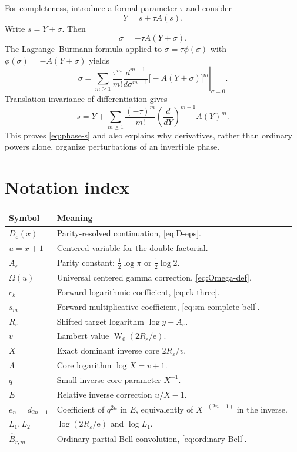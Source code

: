 \documentclass[11pt,a4paper,oneside]{book}
\newcommand{\e}{\mathrm e}
\newcommand{\W}{\operatorname W}
\newcommand{\eps}{\varepsilon}
\begin{document}
For completeness, introduce a formal parameter \(\tau\) and consider
\[
 Y=s+\tau A(s).
\]
Write \(s=Y+\sigma\).  Then
\[
 \sigma=-\tau A(Y+\sigma).
\]
The Lagrange--B\"urmann formula applied to
\(\sigma=\tau\phi(\sigma)\) with
\(\phi(\sigma)=-A(Y+\sigma)\) yields
\[
 \sigma
 =\sum_{m\ge1}\frac{\tau^m}{m!}
 \left.
 \frac{d^{m-1}}{d\sigma^{m-1}}
 \bigl[-A(Y+\sigma)\bigr]^m
 \right|_{\sigma=0}.
\]
Translation invariance of differentiation gives
\[
 s=Y+\sum_{m\ge1}
 \frac{(-\tau)^m}{m!}
 \left(\frac{d}{dY}\right)^{m-1}A(Y)^m.
\]
This proves \cref{eq:phase-s} and also explains why derivatives, rather than
ordinary powers alone, organize perturbations of an invertible phase.

\chapter{Notation index}

\begin{longtable}{p{}p{}}
\toprule
Symbol&Meaning\\
\midrule
\(D_\eps(x)\)&Parity-resolved continuation, \cref{eq:D-eps}.\\
\(u=x+1\)&Centered variable for the double factorial.\\
\(A_\eps\)&Parity constant: \(\tfrac12\log\pi\) or
\(\tfrac12\log2\).\\
\(\Omega(u)\)&Universal centered gamma correction,
\cref{eq:Omega-def}.\\
\(c_k\)&Forward logarithmic coefficient, \cref{eq:ck-three}.\\
\(s_m\)&Forward multiplicative coefficient,
\cref{eq:sm-complete-bell}.\\
\(R_\eps\)&Shifted target logarithm \(\log y-A_\eps\).\\
\(v\)&Lambert value \(\W_0(2R_\eps/\e)\).\\
\(X\)&Exact dominant inverse core \(2R_\eps/v\).\\
\(\Lambda\)&Core logarithm \(\log X=v+1\).\\
\(q\)&Small inverse-core parameter \(X^{-1}\).\\
\(E\)&Relative inverse correction \(u/X-1\).\\
\(e_n=d_{2n-1}\)&Coefficient of \(q^{2n}\) in \(E\), equivalently of
\(X^{-(2n-1)}\) in the inverse.\\
\(L_1,L_2\)&\(\log(2R_\eps/\e)\) and \(\log L_1\).\\
\(\widehat B_{r,m}\)&Ordinary partial Bell convolution,
\cref{eq:ordinary-Bell}.\\
\bottomrule
\end{longtable}
\end{document}
